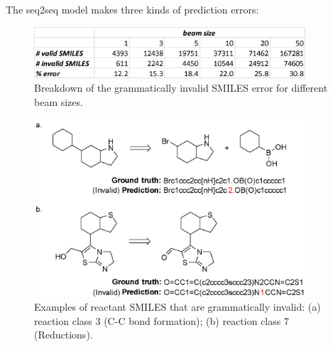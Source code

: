 The seq2seq model makes three kinds of prediction errors:

\begin{figure}
  \centering
  \includegraphics[width=0.9\textwidth]{Images/ret_table_4.png}
  \caption{Breakdown of the grammatically invalid SMILES error for different beam sizes.}
  \label{fig:ret_table2}
\end{figure}

\begin{figure}
  \centering
  \includegraphics[width=0.9\textwidth]{Images/ret_seq2seq_grammer_invalid.png}
  \caption{Examples of reactant SMILES that are grammatically invalid: (a) reaction class 3 (C-C bond formation); (b) reaction class 7 (Reductions).}
  \label{fig:ret_table2}
\end{figure}

